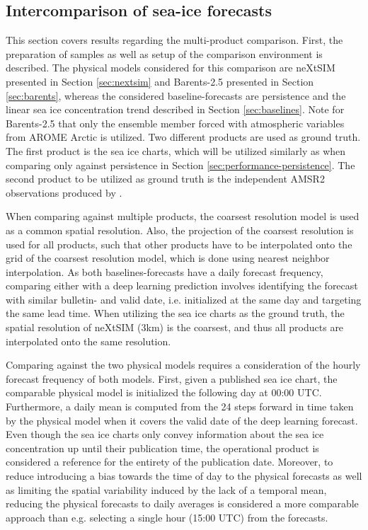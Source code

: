 \documentclass[../main/thesis.tex]{subfiles}
\begin{document}
\subsection{Intercomparison of sea-ice forecasts}
\label{sec:interproduct-compare}
This section covers results regarding the multi-product comparison. First, the preparation of samples as well as setup of the comparison environment is described. The physical models considered for this comparison are neXtSIM \citep{Williams2021} presented in Section \ref{sec:nextsim} and Barents-2.5 \citep{Roehrs2022} presented in Section \ref{sec:barents}, whereas the considered baseline-forecasts are persistence and the linear sea ice concentration trend described in Section \ref{sec:baselines}. Note for Barents-2.5 that only the ensemble member forced with atmospheric variables from AROME Arctic is utilized. Two different products are used as ground truth. The first product is the sea ice charts, which will be utilized similarly as when comparing only against persistence in Section \ref{sec:performance-persistence}. The second product to be utilized as ground truth is the independent AMSR2 observations produced by \citet{Spreen2008}.

When comparing against multiple products, the coarsest resolution model is used as a common spatial resolution. Also, the projection of the coarsest resolution is used for all products, such that other products have to be interpolated onto the grid of the coarsest resolution model, which is done using nearest neighbor interpolation. As both baselines-forecasts have a daily forecast frequency, comparing either with a deep learning prediction involves identifying the forecast with similar bulletin- and valid date, i.e. initialized at the same day and targeting the same lead time. When utilizing the sea ice charts as the ground truth, the spatial resolution of neXtSIM (3km) is the coarsest, and thus all products are interpolated onto the same resolution.

Comparing against the two physical models requires a consideration of the hourly forecast frequency \citep{Williams2021, Roehrs2022} of both models. First, given a published sea ice chart, the comparable physical model is initialized the following day at 00:00 UTC. Furthermore, a daily mean is computed from the 24 steps forward in time taken by the physical model when it covers the valid date of the deep learning forecast. Even though the sea ice charts only convey information about the sea ice concentration up until their publication time, the operational product is considered a reference for the entirety of the publication date. Moreover, to reduce introducing a bias towards the time of day to the physical forecasts as well as limiting the spatial variability induced by the lack of a temporal mean, reducing the physical forecasts to daily averages is considered a more comparable approach than e.g. selecting a single hour (15:00 UTC) from the forecasts.
\end{document}
